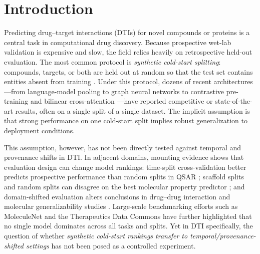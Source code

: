 \documentclass[referee,pdflatex,sn-basic,Numbered]{sn-jnl}
\begin{document}
\section{Introduction}

Predicting drug--target interactions (DTIs) for novel compounds or proteins is a central task in computational drug discovery. Because prospective wet-lab validation is expensive and slow, the field relies heavily on retrospective held-out evaluation. The most common protocol is \emph{synthetic cold-start splitting}: compounds, targets, or both are held out at random so that the test set contains entities absent from training \citep{pahikkala2015toward,liu2007bindingdb,davis2011kinase}. Under this protocol, dozens of recent architectures—from language-model pooling \citep{ahmed2024dtilm} to graph neural networks \citep{nguyen2021graphdta} to contrastive pre-training \citep{singh2023conplex} and bilinear cross-attention \citep{bai2023drugban}—have reported competitive or state-of-the-art results, often on a single split of a single dataset. The implicit assumption is that strong performance on one cold-start split implies robust generalization to deployment conditions.

This assumption, however, has not been directly tested against temporal and provenance shifts in DTI. In adjacent domains, mounting evidence shows that evaluation design can change model rankings: time-split cross-validation better predicts prospective performance than random splits in QSAR \citep{sheridan2013timesplit}; scaffold splits and random splits can disagree on the best molecular property predictor \citep{yang2019chemprop}; and domain-shifted evaluation alters conclusions in drug--drug interaction and molecular generalizability studies \citep{ektefaie2024generalizability,shen2025ddiben}. Large-scale benchmarking efforts such as MoleculeNet \citep{wu2018moleculenet} and the Therapeutics Data Commons \citep{huang2022tdc} have further highlighted that no single model dominates across all tasks and splits. Yet in DTI specifically, the question of whether \emph{synthetic cold-start rankings transfer to temporal/provenance-shifted settings} has not been posed as a controlled experiment.
\end{document}
